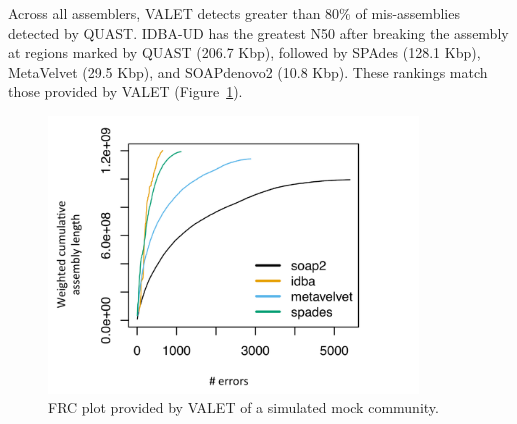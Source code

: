 \documentclass{bioinfo}
\begin{document}
Across all assemblers, VALET detects greater than 80\% of mis-assemblies detected by QUAST.%
IDBA-UD has the greatest N50 after breaking the assembly at regions marked by QUAST (206.7 Kbp), followed by SPAdes (128.1 Kbp), MetaVelvet (29.5 Kbp), and SOAPdenovo2 (10.8 Kbp).
These rankings match those provided by VALET (Figure~\ref{fig:mock_frc}).



\begin{figure}[tb!]
\begin{center}
\includegraphics[width=3.86in]{figures/mock_frc}
\end{center}
\caption[RC plot of a simulated mock community]{FRC plot provided by VALET of a simulated mock community.}
\label{fig:mock_frc}
\end{figure}


%
\end{document}
